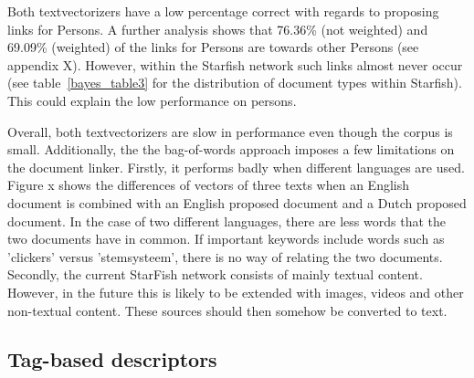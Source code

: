 Both textvectorizers have a low percentage correct with regards to proposing
links for Persons. A further analysis shows that 76.36\% (not weighted) and
69.09\% (weighted) of the links for Persons are towards other Persons (see
appendix X). However, within the Starfish network such links almost never occur
(see table~\ref{bayes_table3} for the distribution of document types within
Starfish). This could explain the low performance on persons. 

Overall, both textvectorizers are slow in performance even though the corpus is
small. Additionally, the the bag-of-words approach imposes a few limitations on
the document linker. Firstly, it performs badly when different languages are
used. Figure x shows the differences of vectors of three texts when an English
document is combined with an English proposed document and a Dutch proposed
document. In the case of two different languages, there are less words that the
two documents have in common. If important keywords include words such as
'clickers' versus 'stemsysteem', there is no way of relating the two documents.
Secondly, the current StarFish network consists of mainly textual content.
However, in the future this is likely to be extended with images, videos and
other non-textual content. These sources should then somehow be converted to
text.

\subsection{Tag-based descriptors}

